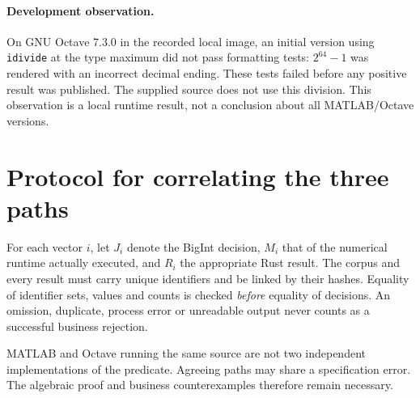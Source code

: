 \documentclass[11pt,a4paper]{article}
\newcommand{\code}[1]{\nolinkurl{#1}}
\begin{document}
\paragraph{Development observation.}
On GNU Octave 7.3.0 in the recorded local image, an initial version using
\code{idivide} at the type maximum did not pass formatting tests:
$2^{64}-1$ was rendered with an incorrect decimal ending.
These tests failed before any positive result was published.
The supplied source does not use this division. This observation is a
local runtime result, not a conclusion about all MATLAB/Octave versions.

\section{Protocol for correlating the three paths}
For each vector $i$, let $J_i$ denote the BigInt decision, $M_i$ that of
the numerical runtime actually executed, and $R_i$ the appropriate Rust result.
The corpus and every result must carry unique identifiers and be linked
by their hashes. Equality of identifier sets, values and counts is checked
\emph{before} equality of decisions.
An omission, duplicate, process error or unreadable output never counts
as a successful business rejection.

\begin{center}
\end{center}
MATLAB and Octave running the same source are not two independent
implementations of the predicate. Agreeing paths may share a specification
error. The algebraic proof and business counterexamples therefore remain
necessary.
\end{document}
